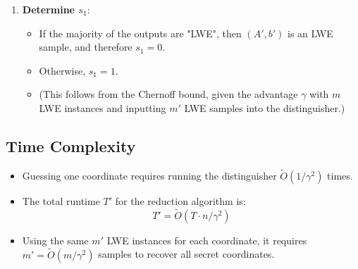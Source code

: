 \documentclass{article}
\begin{document}
\begin{itemize}
\begin{enumerate}
            \item \textbf{Determine \( s_1 \)}:
            \begin{itemize}
                \item If the majority of the outputs are "LWE", then \( (A', b') \) is an LWE sample, and therefore \( s_1 = 0 \).
                \item Otherwise, \( s_1 = 1 \).
                \item (This follows from the Chernoff bound, given the advantage \( \gamma \) with \( m \) LWE instances and inputting \( m' \) LWE samples into the distinguisher.)
            \end{itemize}
        \end{enumerate}
    \end{itemize}

    \subsection*{Time Complexity}
    \begin{itemize}
        \item Guessing one coordinate requires running the distinguisher \( \tilde{O}(1/\gamma^2) \) times.
        \item The total runtime \( T' \) for the reduction algorithm is:
        \[
        T' = \tilde{O}(T \cdot n / \gamma^2)
        \]
        \item Using the same \( m' \) LWE instances for each coordinate, it requires \( m' = \tilde{O}(m/\gamma^2) \) samples to recover all secret coordinates.
    \end{itemize}
    
    \vspace*{20mm}
\end{document}
